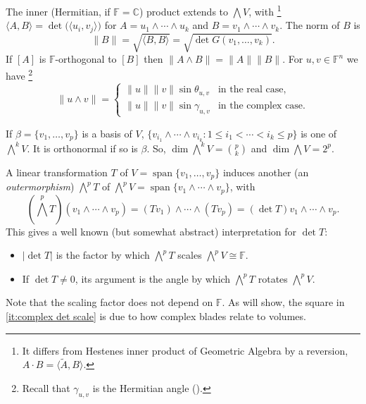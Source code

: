 \documentclass{birkjour}
\theoremstyle{definition}
\def\C			{\mathds{C}}
\def\F			{\mathds{F}}
\newcommand\inner[1] 		{\langle #1 \rangle}		%
\DeclareMathOperator{\Span}{span}
\begin{document}
The inner (Hermitian, if $\F=\C$) product extends to $\bigwedge V$, with%
	\footnote{It differs from Hestenes inner product of Geometric Algebra by a reversion, $A\cdot B = \inner{\tilde{A},B}$.}
$\inner{A,B} = \det\!\big(\inner{u_i,v_j}\big)$ for $A=u_1\wedge\cdots\wedge u_k$ and $B=v_1\wedge\cdots\wedge v_k$.
The norm of $B$ is
\begin{equation}\label{eq:norm}
	\|B\|=\sqrt{\inner{B,B}} = \sqrt{\det G(v_1,\ldots,v_k)}.
\end{equation}
If $[A]$ is $\F$-orthogonal to $[B]$ then $\|A \wedge B\|=\|A\|\|B\|$.
For $u,v \in \F^n$ we have%
	\footnote{Recall that $\gamma_{u,v}$ is the Hermitian angle ().}
\begin{equation}\label{eq:norm 2-blades}
	\|u \wedge v\| = 
	\begin{cases}
		\|u\|\|v\|\sin\theta_{u,v} &\text{in the real case}, \\
		\|u\|\|v\|\sin\gamma_{u,v} &\text{in the complex case}.
	\end{cases}
\end{equation}

If $\beta = \{v_1,\ldots,v_p\}$ is a basis of $V$,
$\{v_{i_1}\wedge\cdots\wedge v_{i_k}: 1\leq i_1 < \cdots<i_k\leq p\}$ is one of $\bigwedge^k V$. It is orthonormal if so is $\beta$.
So, $\dim \bigwedge^k V = \binom{p}{k}$ and $\dim\bigwedge V = 2^p$.

A linear transformation $T$ of $V = \Span\{v_1,\ldots,v_p\}$ induces another (an \emph{outermorphism}) $\bigwedge^p T$ of $\bigwedge^p V = \Span\{v_1\wedge\cdots\wedge v_p\}$, with
\begin{equation}\label{eq:outermorphism}
	{(\textstyle \bigwedge^p T)}(v_1 \wedge \cdots\wedge v_p) = (T v_1) \wedge\cdots\wedge(T v_p) = (\det T) v_1 \wedge \cdots\wedge v_p.
\end{equation}
This gives a well known (but somewhat abstract) interpretation for $\det T$:
\begin{itemize}
	\item  $|\det T|$ is the factor by which $\bigwedge^p T$ scales $\bigwedge^p V \cong \F$.\label{it:|det| outermorphism}
	
	\item If $\det T \neq 0$, its argument is the angle by which $\bigwedge^p T$ rotates $\bigwedge^p V$. \label{it:arg rotates bigwedge}
\end{itemize}
Note that the scaling factor does not depend on $\F$.
As  will show, the square in \ref{it:complex det scale} is due to how complex blades relate to volumes.
\end{document}
